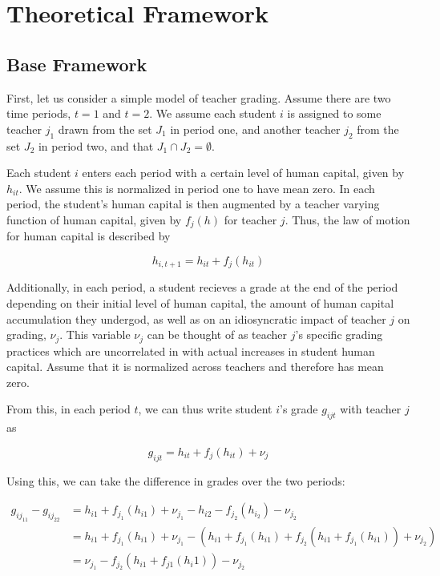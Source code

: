 \documentclass{article}
\begin{document}
\section{Theoretical Framework}

\subsection{Base Framework}

First, let us consider a simple model of teacher grading. Assume there are two time periods, $t = 1$ and $t = 2$. We assume each student $i$ is assigned to some teacher $j_1$ drawn from the set $J_1$ in period one, and another teacher $j_2$ from the set $J_2$ in period two, and that $J_1 \cap J_2 = \emptyset$. 

Each student $i$ enters each period with a certain level of human capital, given by $h_{it}$. We assume this is normalized in period one to have mean zero. In each period, the student's human capital is then augmented by a teacher varying function of human capital, given by $f_{j}(h)$ for teacher $j$. Thus, the law of motion for human capital is described by

\begin{equation}
	h_{i, t+1} = h_{it} + f_j(h_{it})
\end{equation}

Additionally, in each period, a student recieves a grade at the end of the period depending on their initial level of human capital, the amount of human capital accumulation they undergod, as well as on an idiosyncratic impact of teacher $j$ on grading, $\nu_j$. This variable $\nu_j$ can be thought of as teacher $j$'s specific grading practices which are uncorrelated in with actual increases in student human capital. Assume that it is normalized across teachers and therefore has mean zero. 

From this, in each period $t$, we can thus write student $i$'s grade $g_{ijt}$ with teacher $j$ as

\begin{equation}
	g_{ijt} = h_{it} + f_j(h_{it}) + \nu_{j} 
\end{equation}

Using this, we can take the difference in grades over the two periods:

\begin{align}
	g_{ij_11}-g_{ij_22} & = h_{i1}+f_{j_1}(h_{i1})+\nu_{j_1}-h_{i2}-f_{j_2}(h_{i_2})-\nu_{j_2}\\
	& = h_{i1}+f_{j_1}(h_{i1})+\nu_{j_1}-(h_{i1}+f_{j_1}(h_{i1})+f_{j_2}(h_{i1}+f_{j_1}(h_{i1}))+\nu_{j_2})\\
	& = \nu_{j_1}-f_{j_2}(h_{i1}+f_{j1}(h_i1))-\nu_{j_2}
\end{align}
\end{document}
